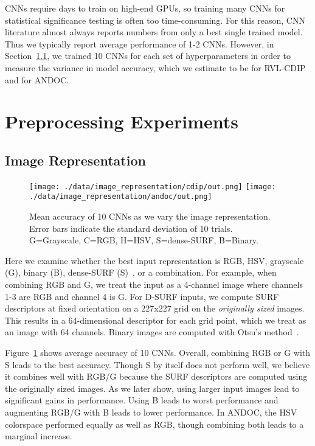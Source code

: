 \documentclass[10pt, conference, compsocconf]{IEEEtran}
\newcommand{\squeezeup}{\vspace{-2.5mm}}
\begin{document}
CNNs require days to train on high-end GPUs, so training many CNNs for statistical significance testing is often too time-consuming.
For this reason, CNN literature almost always reports numbers from only a best single trained model.
Thus we typically report average performance of 1-2 CNNs.
However, in Section~\ref{sec:image_rep}, we trained 10 CNNs for each set of hyperparameters in order to measure the variance in model accuracy, which we estimate to be  for RVL-CDIP and  for ANDOC. 


\section{Preprocessing Experiments}

\subsection{Image Representation}
\label{sec:image_rep}

\begin{figure}
\texttt{[image: ./data/image\_representation/cdip/out.png]}
\texttt{[image: ./data/image\_representation/andoc/out.png]}

\caption{Mean accuracy of 10 CNNs as we vary the image representation.  Error bars indicate the standard deviation of 10 trials. G=Grayscale, C=RGB, H=HSV, S=dense-SURF, B=Binary.}
\label{fig:image_rep}
\squeezeup
\end{figure}
	
Here we examine whether the best input representation is RGB, HSV, grayscale (G), binary (B), dense-SURF (S)~\cite{bay08}, or a combination.
For example, when combining RGB and G, we treat the input as a 4-channel image where channels 1-3 are RGB and channel 4 is G.
For D-SURF inputs, we compute SURF descriptors at fixed orientation on a 227x227 grid on the \emph{originally sized} images.
This results in a 64-dimensional descriptor for each grid point, which we treat as an image with 64 channels.
Binary images are computed with Otsu's method~\cite{otsu75}.

Figure~\ref{fig:image_rep} shows average accuracy of 10 CNNs.
Overall, combining RGB or G with S leads to the best accuracy.
Though S by itself does not perform well, we believe it combines well with RGB/G because the SURF descriptors are computed using the originally sized images.
As we later show, using larger input images lead to significant gains in performance.
Using B leads to worst performance and augmenting RGB/G with B leads to lower performance.
In ANDOC, the HSV colorspace performed equally as well as RGB, though combining both leads to a marginal increase.
\end{document}
